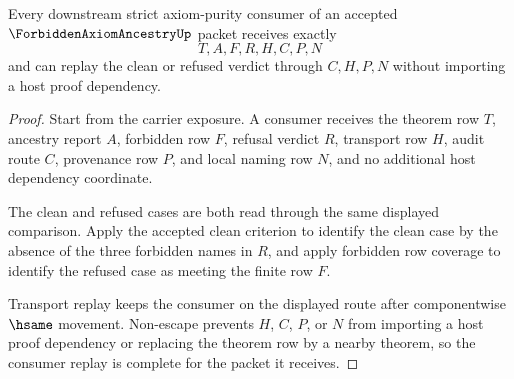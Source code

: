 \begin{theorem}
\label{thm:forbidden-axiom-ancestry-consumer-replay-completeness}
Every downstream strict axiom-purity consumer of an accepted $\ForbiddenAxiomAncestryUp$ packet receives exactly
$$
T,A,F,R,H,C,P,N
$$
and can replay the clean or refused verdict through $C,H,P,N$ without importing a host proof dependency.
\end{theorem}
\begin{proof}
Start from the carrier exposure. A consumer receives the theorem row $T$, ancestry report $A$, forbidden row $F$, refusal verdict $R$, transport row $H$, audit route $C$, provenance row $P$, and local naming row $N$, and no additional host dependency coordinate.

The clean and refused cases are both read through the same displayed comparison. Apply the accepted clean criterion to identify the clean case by the absence of the three forbidden names in $R$, and apply forbidden row coverage to identify the refused case as meeting the finite row $F$.

Transport replay keeps the consumer on the displayed route after componentwise $\hsame$ movement. Non-escape prevents $H$, $C$, $P$, or $N$ from importing a host proof dependency or replacing the theorem row by a nearby theorem, so the consumer replay is complete for the packet it receives.
\end{proof}



